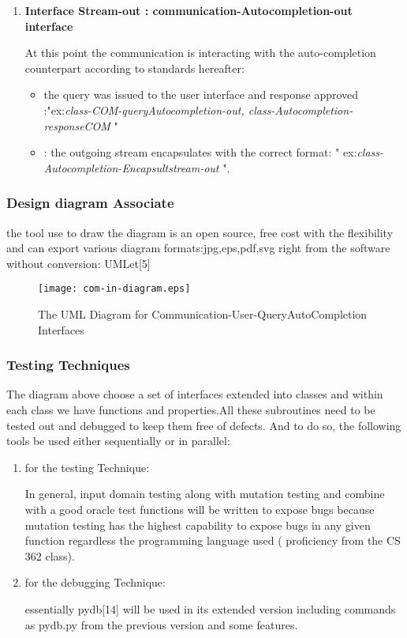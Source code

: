 \documentclass [10pt]{article}
\begin{document}
\begin{enumerate}
\item \textbf{Interface Stream-out : communication-Autocompletion-out interface} \par
At this point the communication is interacting with the auto-completion counterpart according to standards hereafter:
\begin{itemize}
 \item  the query was issued to the user interface and response approved :"ex:\textit{class-COM-queryAutocompletion-out, class-Autocompletion-responseCOM} "
\item : the outgoing stream encapsulates with the correct format: " ex:\textit{class-Autocompletion-Encapsultstream-out } ".
\end{itemize}

\end{enumerate}

\subsubsection{ Design  diagram Associate}\par 
the tool use to draw the diagram is an open source, free cost with the flexibility and can export various diagram formats:jpg,eps,pdf,svg right from the software without conversion: UMLet[5] 
\begin{figure}[ht]
\centering
\texttt{[image: com-in-diagram.eps]}
\caption{The UML Diagram for Communication-User-QueryAutoCompletion Interfaces}
\end{figure}


\pagebreak
\subsubsection{Testing Techniques}
The diagram above choose a set of interfaces extended into classes and within each class we have functions and properties.All these subroutines need to be tested out and debugged to keep them free of defects. And to do so, the following tools be used either sequentially or in parallel:\par 
\begin{enumerate}
\item for the testing Technique:\par 
In general, input domain testing along with mutation testing and combine with a good oracle test functions will be written to expose bugs because mutation testing has the highest capability to expose bugs in any given function regardless the programming language used ( proficiency from the CS 362 class).\par 
\item for the debugging Technique:\par 
essentially pydb[14] will be used in its extended version including commands as pydb.py from the previous version and some features.
\end{enumerate}
\end{document}

